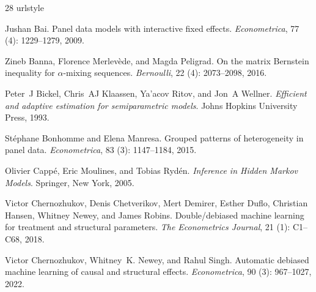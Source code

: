 \documentclass[twoside]{article}
\theoremstyle{definition}
\begin{document}
% 
\begin{thebibliography}{28}
\setlength{\itemsep}{-4.0pt}
\footnotesize
\providecommand{\natexlab}[1]{#1}
\providecommand{\url}[1]{\texttt{#1}}
\expandafter\ifx\csname urlstyle\endcsname\relax
  \providecommand{\doi}[1]{doi: #1}\else
  \providecommand{\doi}{doi: \begingroup \urlstyle{rm}\Url}\fi

Jushan Bai.
\newblock Panel data models with interactive fixed effects.
\newblock \emph{Econometrica}, 77 (4): 1229--1279, 2009.

Zineb Banna, Florence Merlev{\`e}de, and Magda Peligrad.
\newblock On the matrix {B}ernstein inequality for $\alpha$-mixing sequences.
\newblock \emph{Bernoulli}, 22 (4): 2073--2098, 2016.

Peter~J Bickel, Chris~AJ Klaassen, Ya'acov Ritov, and Jon~A Wellner.
\newblock \emph{Efficient and adaptive estimation for semiparametric models}.
\newblock Johns Hopkins University Press, 1993.

St{\'e}phane Bonhomme and Elena Manresa.
\newblock Grouped patterns of heterogeneity in panel data.
\newblock \emph{Econometrica}, 83 (3): 1147--1184, 2015.

Olivier Capp{\'e}, Eric Moulines, and Tobias Ryd{\'e}n.
\newblock \emph{Inference in Hidden Markov Models}.
\newblock Springer, New York, 2005.

Victor Chernozhukov, Denis Chetverikov, Mert Demirer, Esther Duflo, Christian Hansen, Whitney Newey, and James Robins.
\newblock Double/debiased machine learning for treatment and structural parameters.
\newblock \emph{The Econometrics Journal}, 21 (1): C1--C68, 2018.

Victor Chernozhukov, Whitney~K. Newey, and Rahul Singh.
\newblock Automatic debiased machine learning of causal and structural effects.
\newblock \emph{Econometrica}, 90 (3): 967--1027, 2022.


\end{thebibliography}
\end{document}
